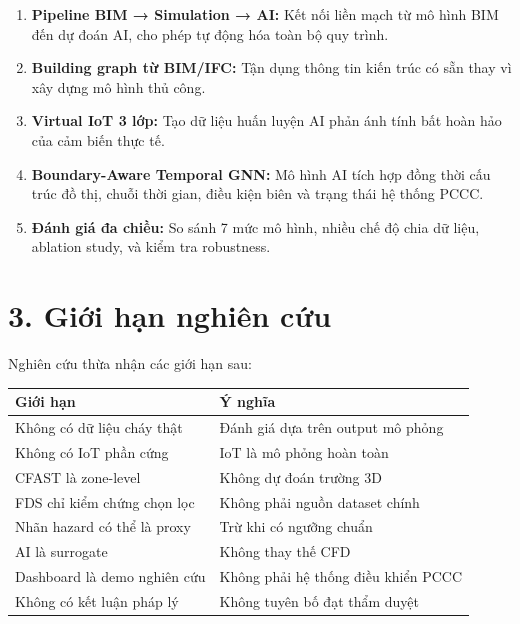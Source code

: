 \begin{enumerate}
  \item \textbf{Pipeline BIM → Simulation → AI:} Kết nối liền mạch từ mô hình BIM đến dự đoán AI, cho phép tự động hóa toàn bộ quy trình.
  \item \textbf{Building graph từ BIM/IFC:} Tận dụng thông tin kiến trúc có sẵn thay vì xây dựng mô hình thủ công.
  \item \textbf{Virtual IoT 3 lớp:} Tạo dữ liệu huấn luyện AI phản ánh tính bất hoàn hảo của cảm biến thực tế.
  \item \textbf{Boundary-Aware Temporal GNN:} Mô hình AI tích hợp đồng thời cấu trúc đồ thị, chuỗi thời gian, điều kiện biên và trạng thái hệ thống PCCC.
  \item \textbf{Đánh giá đa chiều:} So sánh 7 mức mô hình, nhiều chế độ chia dữ liệu, ablation study, và kiểm tra robustness.
\end{enumerate}

\section*{3. Giới hạn nghiên cứu}

Nghiên cứu thừa nhận các giới hạn sau:

\begin{table}[H]
\centering
\begin{tabularx}{\textwidth}{l X}
\toprule
\textbf{Giới hạn} & \textbf{Ý nghĩa} \\
\midrule
Không có dữ liệu cháy thật      & Đánh giá dựa trên output mô phỏng \\
Không có IoT phần cứng           & IoT là mô phỏng hoàn toàn \\
CFAST là zone-level              & Không dự đoán trường 3D \\
FDS chỉ kiểm chứng chọn lọc     & Không phải nguồn dataset chính \\
Nhãn hazard có thể là proxy      & Trừ khi có ngưỡng chuẩn \\
AI là surrogate                  & Không thay thế CFD \\
Dashboard là demo nghiên cứu     & Không phải hệ thống điều khiển PCCC \\
Không có kết luận pháp lý        & Không tuyên bố đạt thẩm duyệt \\
\bottomrule
\end{tabularx}
\end{table}

